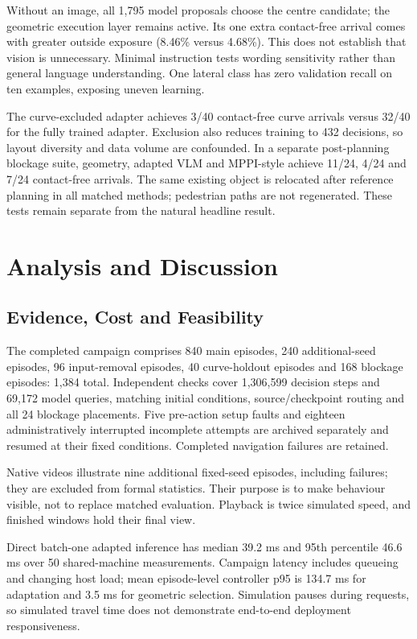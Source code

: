 \documentclass[a4paper,12pt]{article}
\begin{document}
Without an image, all 1,795 model proposals choose the centre candidate; the geometric execution layer remains active. Its one extra contact-free arrival comes with greater outside exposure (8.46\% versus 4.68\%). This does not establish that vision is unnecessary. Minimal instruction tests wording sensitivity rather than general language understanding. One lateral class has zero validation recall on ten examples, exposing uneven learning.

The curve-excluded adapter achieves 3/40 contact-free curve arrivals versus 32/40 for the fully trained adapter. Exclusion also reduces training to 432 decisions, so layout diversity and data volume are confounded. In a separate post-planning blockage suite, geometry, adapted VLM and MPPI-style achieve 11/24, 4/24 and 7/24 contact-free arrivals. The same existing object is relocated after reference planning in all matched methods; pedestrian paths are not regenerated. These tests remain separate from the natural headline result.

\FloatBarrier
\section{Analysis and Discussion}
\subsection{Evidence, Cost and Feasibility}
The completed campaign comprises 840 main episodes, 240 additional-seed episodes, 96 input-removal episodes, 40 curve-holdout episodes and 168 blockage episodes: 1,384 total. Independent checks cover 1,306,599 decision steps and 69,172 model queries, matching initial conditions, source/checkpoint routing and all 24 blockage placements. Five pre-action setup faults and eighteen administratively interrupted incomplete attempts are archived separately and resumed at their fixed conditions. Completed navigation failures are retained.

Native videos illustrate nine additional fixed-seed episodes, including failures; they are excluded from formal statistics. Their purpose is to make behaviour visible, not to replace matched evaluation. Playback is twice simulated speed, and finished windows hold their final view.

Direct batch-one adapted inference has median 39.2 ms and 95th percentile 46.6 ms over 50 shared-machine measurements. Campaign latency includes queueing and changing host load; mean episode-level controller p95 is 134.7 ms for adaptation and 3.5 ms for geometric selection. Simulation pauses during requests, so simulated travel time does not demonstrate end-to-end deployment responsiveness.
\end{document}

